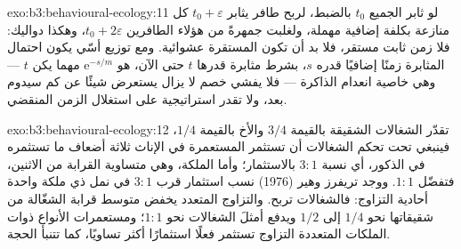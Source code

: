 \begin{solution}{exo:b3:behavioural-ecology:11}
لو ثابر الجميع $t_{0}$ بالضبط، لربح طافر يثابر $t_{0} +
\varepsilon$ كل منازعة بكلفة إضافية مهملة، ولغلبت
جمهرةً من هؤلاء الطافرين $t_{0} + 2\varepsilon$، وهكذا
دواليك: فلا زمن ثابت مستقر، فلا بد أن تكون المستقرة عشوائية. ومع
توزيع أسّي يكون احتمال المثابرة زمنًا إضافيًا قدره
$s$، بشرط مثابرة قدرها $t$ حتى الآن، هو $\mathrm{e}^{-s/m}$ مهما يكن $t$
--- وهي خاصية انعدام الذاكرة --- فلا يفشي خصم لا يزال يستعرض
شيئًا عن كم سيدوم بعد، ولا تقدر استراتيجية على
استغلال الزمن المنقضي.
\end{solution}

\begin{solution}{exo:b3:behavioural-ecology:12}
تقدّر الشغالات الشقيقة بالقيمة $3/4$ والأخ بالقيمة $1/4$، فينبغي تحت
تحكم الشغالات أن تستثمر المستعمرة في الإناث ثلاثة أضعاف ما
تستثمره في الذكور، أي نسبة $3{:}1$ بالاستثمار؛ وأما الملكة، وهي متساوية
القرابة من الاثنين، فتفضّل $1{:}1$. ووجد تريفرز وهير (1976) نسب
استثمار قرب $3{:}1$ في نمل ذي ملكة واحدة أحادية التزاوج: فالشغالات
تربح. والتزاوج المتعدد يخفض متوسط قرابة الشغّالة من شقيقاتها
نحو $1/4$ إلى $1/2$ ويدفع أمثلَ الشغالات نحو $1{:}1$؛
ومستعمرات الأنواع ذوات الملكات المتعددة التزاوج تستثمر فعلًا
استثمارًا أكثر تساويًا، كما تتنبأ الحجة.
\end{solution}

